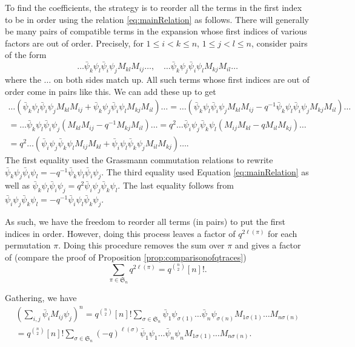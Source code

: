 \documentclass[12pt, reqno]{amsart}
\theoremstyle{definition}
\begin{document}
To find the coefficients, the strategy is to reorder all the terms in the first index to be in order using the relation \eqref{eq:mainRelation} as follows. There will generally be many pairs of compatible terms in the expansion whose first indices of various factors are out of order. Precisely, for $1 \leq i < k \leq n$, $1 \leq j < l \leq n$, consider pairs of the form
$$
\dots 
\bar{\psi}_k \psi_{l} \bar{\psi}_i \psi_j   M_{k l} M_{i j}
\dots
,\quad
\dots 
\bar{\psi}_k \psi_{j} \bar{\psi}_i \psi_{l}   M_{k j} M_{i l}
\dots
$$
where the $\dots$ on both sides match up. All such terms whose first indices are out of order come in pairs like this.  We can add these up to get
\begin{gather*}
\dots 
( 
\bar{\psi}_k \psi_{l} \bar{\psi}_i \psi_j   M_{k l} M_{i j} 
+
\bar{\psi}_k \psi_{j} \bar{\psi}_i \psi_{l}   M_{k j} M_{i l}
)
\dots
=
\dots 
( 
\bar{\psi}_k \psi_{l} \bar{\psi}_i \psi_j   M_{k l} M_{i j} 
- 
q^{-1}
\bar{\psi}_k \psi_{l} \bar{\psi}_i \psi_j   M_{k j} M_{i l}
)
\dots
\\
=
\dots 
\bar{\psi}_k \psi_{l} \bar{\psi}_i \psi_j
( 
M_{k l} M_{i j} - q^{-1} M_{k j} M_{i l}
)
\dots
=
q^{2} 
\dots 
\bar{\psi}_i \psi_j \bar{\psi}_k \psi_{l}
( 
M_{i j} M_{k l} - q M_{i l} M_{k j}
)
\dots
\\
=
q^{2} 
\dots
( 
\bar{\psi}_i \psi_j \bar{\psi}_k \psi_{l}
M_{i j} M_{k l} + 
\bar{\psi}_i \psi_l \bar{\psi}_k \psi_{j} M_{i l} M_{k j}
)
\dots.
\end{gather*}
The first equality used the Grassmann commutation relations to rewrite  $\bar{\psi}_k \psi_{j} \bar{\psi}_i \psi_{l} = -q^{-1} \bar{\psi}_k \psi_{l} \bar{\psi}_i \psi_j$. The third equality used Equation \eqref{eq:mainRelation} as well as  $\bar{\psi}_k \psi_{l} \bar{\psi}_i \psi_j = q^{2} \bar{\psi}_i \psi_j \bar{\psi}_k \psi_{l}$. The last equality follows from $\bar{\psi}_i \psi_j \bar{\psi}_k \psi_{l} = -q^{-1}\bar{\psi}_i \psi_l \bar{\psi}_k \psi_{j}$.

As such, we have the freedom to reorder all terms (in pairs) to put the first indices in order. However, doing this process leaves a factor of $q^{2 \ell(\pi)}$ for each permutation $\pi$.  Doing this procedure removes the sum over $\pi$ and gives a factor of (compare the proof of Proposition \ref{prop:comparisonofqtraces})
$$
\sum_{\pi \in \mathfrak{S}_n} q^{2\ell(\pi)} = q^{\binom{n}{2}} [n]!.
$$

Gathering, we have
\begin{gather*}
\left(\sum_{i,j} \bar{\psi}_i  M_{i j}\psi_j\right)^n
=
q^{\binom{n}{2}} [n]!
\sum_{\sigma \in \mathfrak{S}_n}
\bar{\psi}_{1} \psi_{\sigma(1)} \dots \bar{\psi}_{n} \psi_{\sigma(n)}
M_{1 \sigma(1)} \dots M_{n \sigma(n)}
\\
=
q^{\binom{n}{2}} [n]!
\sum_{\sigma \in \mathfrak{S}_n}
(-q)^{\ell(\sigma)}
\bar{\psi}_{1} \psi_{1} \dots \bar{\psi}_{n} \psi_{n}
M_{1 \sigma(1)} \dots M_{n \sigma(n)}.
\end{gather*}
\end{document}
